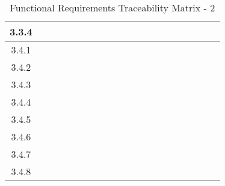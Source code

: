 \documentclass[titlepage]{article}
\begin{document}
\begin{center}
\begin{table}[h!]
\begin{tabular}{|c|c|c|c|c |c|c|c|c|c |c|c|c|c|c |c|c|c|c|c|}
3.3.4 &&&& &&&&& &&&&& &&&&&\\\hline
3.4.1 &&&& &&&&& &&&&& &&&&&\\\hline
3.4.2 &&&& &&&&& &&&&& &&&&&\\\hline
3.4.3 &&&& &&&&& &&&&& &&&&&\\\hline
3.4.4 &&&& &&&&& &&&&& &&&&&\\\hline
3.4.5 &&&& &&&&& &&&&& &&&&&\\\hline
3.4.6 &&&& &&&&& &&&&& &&&&&\\\hline
3.4.7 &&&& &&&&& &&&&& &&&&&\\\hline
3.4.8 &&&& &&&&& &&&&& &&&&&\\\hline
\end{tabular}
\caption{Functional Requirements Traceability Matrix - 2}
\end{table}
\end{center}
\newpage
\end{document}
